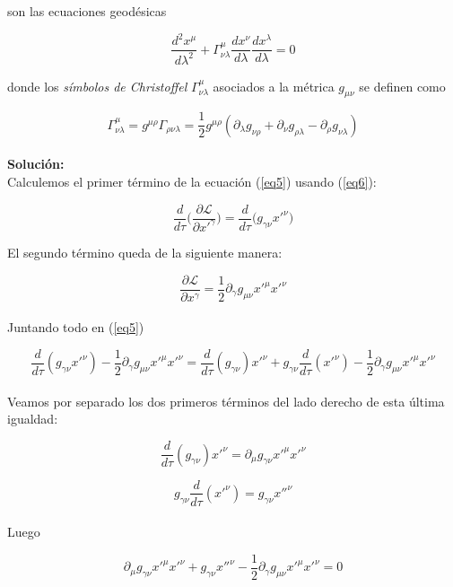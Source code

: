 son las ecuaciones geod\'esicas

\begin{equation}
    \frac{d^{2}x^{\mu}}{d\lambda^{2}} + \Gamma^{\mu}_{\nu \lambda}\frac{dx^{\nu}}{d\lambda}\frac{dx^{\lambda}}{d\lambda} = 0
    \label{eq7}
\end{equation}

donde los \textit{s\'imbolos de Christoffel} $\Gamma^{\mu}_{\nu \lambda}$ asociados a la m\'etrica $g_{\mu \nu}$ se definen como

\begin{equation}
    \Gamma^{\mu}_{\nu \lambda} = g^{\mu \rho}\Gamma_{\rho \nu \lambda} = \frac{1}{2}g^{\mu \rho}(\partial_{\lambda}g_{\nu \rho} + \partial_{\nu}g_{\rho \lambda} - \partial_{\rho}g_{\nu \lambda})
    \label{eq8}
\end{equation}\\

\textbf{Soluci\'on:}\\

Calculemos el primer t\'ermino de la ecuaci\'on (\ref{eq5}) usando (\ref{eq6}):

$$\frac{d}{d\tau}\bigg(\frac{\partial \mathcal{L}}{\partial x'^{\gamma}}\bigg) = \frac{d}{d\tau}\bigg(g_{\gamma \nu}x'^{\nu}\bigg)$$

El segundo t\'ermino queda de la siguiente manera:

$$\frac{\partial \mathcal{L}}{\partial x^{\gamma}} = \frac{1}{2}\partial_{\gamma}g_{\mu \nu}x'^{\mu}x'^{\nu}$$\\

Juntando todo en (\ref{eq5})

$$\frac{d}{d\tau}(g_{\gamma \nu}x'^{\nu}) - \frac{1}{2}\partial_{\gamma}g_{\mu \nu}x'^{\mu}x'^{\nu} = \frac{d}{d\tau}(g_{\gamma \nu})x'^{\nu} + g_{\gamma \nu}\frac{d}{d\tau}(x'^{\nu}) - \frac{1}{2}\partial_{\gamma}g_{\mu \nu}x'^{\mu}x'^{\nu}$$\\

Veamos por separado los dos primeros t\'erminos del lado derecho de esta \'ultima igualdad:

$$\frac{d}{d\tau}(g_{\gamma \nu})x'^{\nu} = \partial_{\mu}g_{\gamma \nu}x'^{\mu}x'^{\nu}$$

$$g_{\gamma \nu}\frac{d}{d\tau}(x'^{\nu}) = g_{\gamma \nu}x''^{\nu}$$\\

Luego

$$\partial_{\mu}g_{\gamma \nu}x'^{\mu}x'^{\nu} + g_{\gamma \nu}x''^{\nu} - \frac{1}{2}\partial_{\gamma}g_{\mu \nu}x'^{\mu}x'^{\nu} = 0$$

